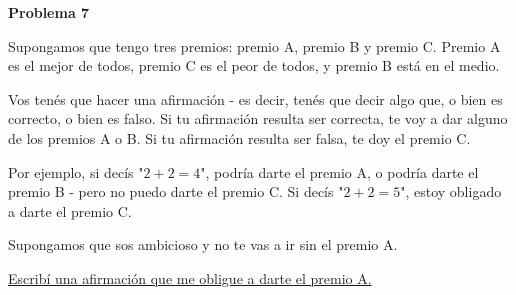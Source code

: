 \begin{center}
\Large \textbf{Problema 7}
\end{center}

Supongamos que tengo tres premios: premio A, premio B y premio C.
Premio A es el mejor de todos, premio C es el peor de todos, y premio B está en el medio.

\bigskip

Vos tenés que hacer una afirmación - es decir, tenés que decir algo que, o bien es correcto, o bien es falso.
Si tu afirmación resulta ser correcta, te voy a dar alguno de los premios A o B. Si tu afirmación resulta ser falsa, te doy el premio C.

\bigskip


Por ejemplo, si decís "$2 + 2 = 4$", podría darte el premio A, o podría darte el premio B - pero no puedo darte el premio C. Si decís "$2 + 2 = 5$", estoy obligado a darte el premio C.

\bigskip

Supongamos que sos ambicioso y no te vas a ir sin el premio A.

\underline{Escribí una afirmación que me obligue a darte el premio A.}


